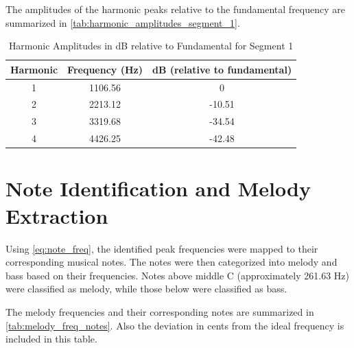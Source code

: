 The amplitudes of the harmonic peaks relative to the fundamental frequency are summarized in \autoref{tab:harmonic_amplitudes_segment_1}. 

\begin{table}[H]
\centering
\caption{Harmonic Amplitudes in dB relative to Fundamental for Segment 1}
\begin{tabular}{|c|c|c|}
\hline
Harmonic & Frequency (Hz) & dB (relative to fundamental) \\
\hline
1 & 1106.56 & 0 \\
2 & 2213.12 & -10.51 \\
3 & 3319.68 & -34.54 \\
4 & 4426.25 & -42.48 \\
\hline
\end{tabular}
\label{tab:harmonic_amplitudes_segment_1}
\end{table}


\section{Note Identification and Melody Extraction}

Using \autoref{eq:note_freq}, the identified peak frequencies were mapped to their corresponding musical notes. The notes were then categorized into melody and bass based on their frequencies. Notes above middle C (approximately 261.63 Hz) were classified as melody, while those below were classified as bass.

The melody frequencies and their corresponding notes are summarized in \autoref{tab:melody_freq_notes}. Also the deviation in cents from the ideal frequency is included in this table.

